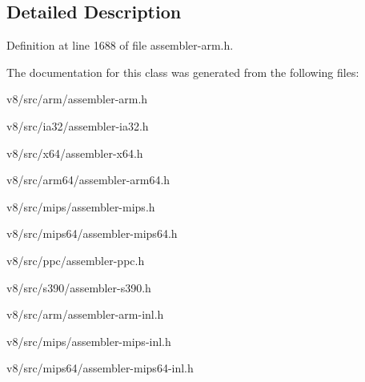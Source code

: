 \subsection{Detailed Description}


Definition at line 1688 of file assembler-\/arm.\+h.



The documentation for this class was generated from the following files\+:\begin{DoxyCompactItemize}
\item 
v8/src/arm/assembler-\/arm.\+h\item 
v8/src/ia32/assembler-\/ia32.\+h\item 
v8/src/x64/assembler-\/x64.\+h\item 
v8/src/arm64/assembler-\/arm64.\+h\item 
v8/src/mips/assembler-\/mips.\+h\item 
v8/src/mips64/assembler-\/mips64.\+h\item 
v8/src/ppc/assembler-\/ppc.\+h\item 
v8/src/s390/assembler-\/s390.\+h\item 
v8/src/arm/assembler-\/arm-\/inl.\+h\item 
v8/src/mips/assembler-\/mips-\/inl.\+h\item 
v8/src/mips64/assembler-\/mips64-\/inl.\+h\end{DoxyCompactItemize}
